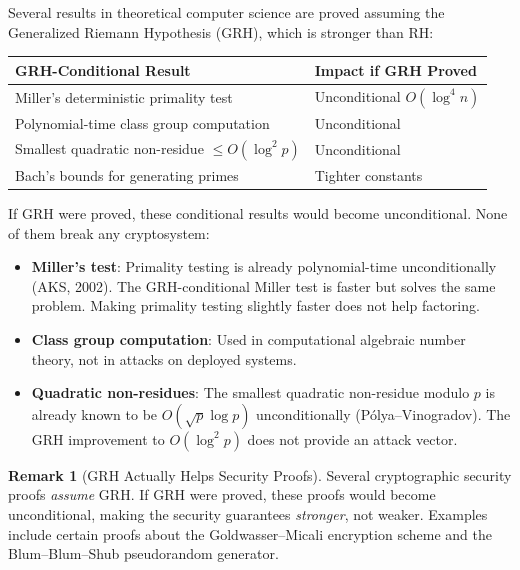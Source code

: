 \documentclass[11pt,a4paper]{article}
\theoremstyle{definition}
\newtheorem{remark}[theorem]{Remark}
\theoremstyle{plain}
\begin{document}
Several results in theoretical computer science are proved
assuming the Generalized Riemann Hypothesis (GRH), which is
stronger than RH:

\begin{center}
\begin{tabular}{@{}ll@{}}
\toprule
\textbf{GRH-Conditional Result} & \textbf{Impact if GRH Proved} \\
\midrule
Miller's deterministic primality test & Unconditional $O(\log^4 n)$ \\
Polynomial-time class group computation & Unconditional \\
Smallest quadratic non-residue $\leq O(\log^2 p)$ & Unconditional \\
Bach's bounds for generating primes & Tighter constants \\
\bottomrule
\end{tabular}
\end{center}

If GRH were proved, these conditional results would become
unconditional. None of them break any cryptosystem:

\begin{itemize}
  \item \textbf{Miller's test}: Primality testing is already
    polynomial-time unconditionally (AKS, 2002). The GRH-conditional
    Miller test is faster but solves the same problem. Making
    primality testing slightly faster does not help factoring.
  \item \textbf{Class group computation}: Used in computational
    algebraic number theory, not in attacks on deployed systems.
  \item \textbf{Quadratic non-residues}: The smallest quadratic
    non-residue modulo $p$ is already known to be $O(\sqrt{p}\log p)$
    unconditionally (P\'olya--Vinogradov). The GRH improvement to
    $O(\log^2 p)$ does not provide an attack vector.
\end{itemize}

\begin{remark}[GRH Actually Helps Security Proofs]
Several cryptographic security proofs \emph{assume} GRH. If GRH
were proved, these proofs would become unconditional, making the
security guarantees \emph{stronger}, not weaker. Examples include
certain proofs about the Goldwasser--Micali encryption scheme and
the Blum--Blum--Shub pseudorandom generator.
\end{remark}

\end{document}
